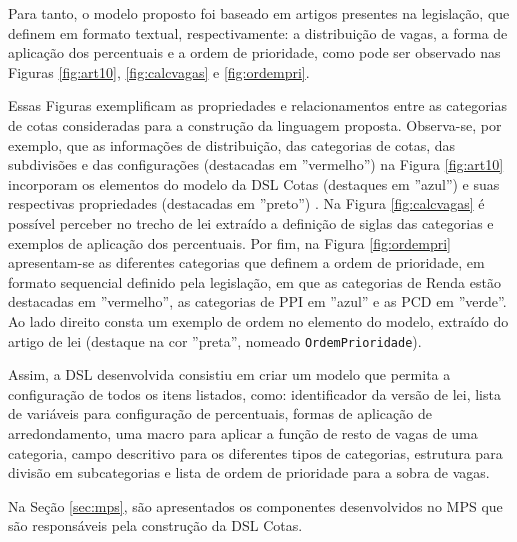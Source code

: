    Para tanto, o modelo proposto foi baseado em artigos presentes na legislação, que definem em formato textual, respectivamente: a distribuição de vagas, a forma de aplicação dos percentuais e a ordem de prioridade, como pode ser observado nas Figuras \ref{fig:art10}, \ref{fig:calcvagas} e \ref{fig:ordempri}. 
   
   
   
   
   
   
   
   Essas Figuras exemplificam as propriedades e relacionamentos entre as categorias de cotas consideradas para a construção da linguagem proposta. Observa-se, por exemplo, que as informações de distribuição, das categorias de cotas, das subdivisões e das configurações (destacadas em ''vermelho'') na Figura \ref{fig:art10} incorporam os elementos do modelo da DSL Cotas (destaques em ''azul'') e suas respectivas propriedades (destacadas em ''preto'') . Na Figura \ref{fig:calcvagas} é possível perceber no trecho de lei extraído a definição de siglas das categorias e exemplos de aplicação dos percentuais. Por fim, na Figura \ref{fig:ordempri} apresentam-se as diferentes categorias que definem a ordem de prioridade, em formato sequencial definido pela legislação, em que as categorias de Renda estão destacadas em ''vermelho'', as categorias de \gls{PPI} em ''azul'' e as \gls{PCD} em ''verde''. Ao lado direito consta um exemplo de ordem no elemento do modelo, extraído do artigo de lei (destaque na cor ''preta'', nomeado \texttt{OrdemPrioridade}).
  
   
  Assim, a \gls{DSL} desenvolvida consistiu em criar um modelo que permita a configuração de todos os itens listados, como: identificador da versão de lei, lista de variáveis para configuração de percentuais, formas de aplicação de arredondamento, uma macro para aplicar a função de resto de vagas de uma categoria, campo descritivo para os diferentes tipos de categorias, estrutura para divisão em subcategorias e lista de ordem de prioridade para a sobra de vagas.

   
    Na Seção \ref{sec:mps}, são apresentados os componentes desenvolvidos no MPS que são responsáveis pela construção da DSL Cotas.
    
   
